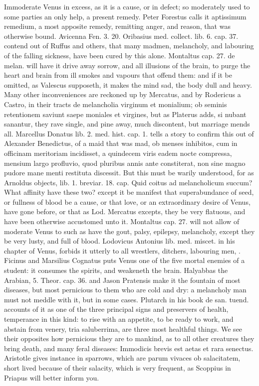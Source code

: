 {Immoderate Venus in excess, as it is a cause, or in defect; so
moderately used to some parties an only help, a present remedy. Peter
Forestus calls it aptissimum remedium, a most apposite remedy,
remitting anger, and reason, that was otherwise bound. Avicenna
Fen. 3. 20. Oribasius med. collect. lib. 6. cap. 37. contend out of
Ruffus and others,  that many madmen, melancholy, and labouring
of the falling sickness, have been cured by this alone. Montaltus cap.
27. de melan. will have it drive away sorrow, and all illusions of the
brain, to purge the heart and brain from ill smokes and vapours that
offend them: and if it be omitted, as Valescus supposeth, it
makes the mind sad, the body dull and heavy. Many other inconveniences
are reckoned up by Mercatus, and by Rodericus a Castro, in their tracts
de melancholia virginum et monialium; ob seminis retentionem saviunt
saepe moniales et virgines, but as Platerus adds, si nubant sanantur,
they rave single, and pine away, much discontent, but marriage mends
all. Marcellus Donatus lib. 2. med. hist. cap. 1. tells a story to
confirm this out of Alexander Benedictus, of a maid that was mad, ob
menses inhibitos, cum in officinam meritoriam incidisset, a quindecem
viris eadem nocte compressa, mensium largo profluvio, quod pluribus
annis ante constiterat, non sine magno pudore mane menti restituta
discessit. But this must be warily understood, for as Arnoldus objects,
lib. 1. breviar. 18. cap. Quid coitus ad melancholicum succum? What
affinity have these two? except it be manifest that
superabundance of seed, or fullness of blood be a cause, or that love,
or an extraordinary desire of Venus, have gone before, or that as Lod.
Mercatus excepts, they be very flatuous, and have been otherwise
accustomed unto it. Montaltus cap. 27. will not allow of moderate Venus
to such as have the gout, palsy, epilepsy, melancholy, except they be
very lusty, and full of blood. Lodovicus Antonius lib. med.
miscet. in his chapter of Venus, forbids it utterly to all wrestlers,
ditchers, labouring men, \etc{}. Ficinus and Marsilius Cognatus
puts Venus one of the five mortal enemies of a student: it consumes the
spirits, and weakeneth the brain. Halyabbas the Arabian, 5. Theor. cap.
36. and Jason Pratensis make it the fountain of most diseases,
but most pernicious to them who are cold and dry: a melancholy
man must not meddle with it, but in some cases. Plutarch in his book de
san. tuend. accounts of it as one of the three principal signs and
preservers of health, temperance in this kind: to rise with an
appetite, to be ready to work, and abstain from venery, tria
saluberrima, are three most healthful things. We see their opposites
how pernicious they are to mankind, as to all other creatures they
bring death, and many feral diseases: Immodicis brevis est aetas et
rara senectus. Aristotle gives instance in sparrows, which are parum
vivaces ob salacitatem, short lived because of their salacity,
which is very frequent, as Scoppius in Priapus will better inform you.

}
